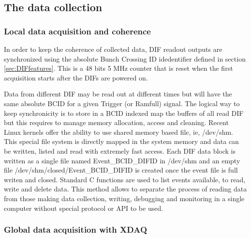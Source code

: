 \documentclass[english]{article}
\begin{document}
\subsection{The data collection}

\subsubsection{Local data acquisition and coherence}

 In order to  keep the coherence of collected data, DIF  readout outputs are synchronized using the absolute Bunch Crossing ID idedentifier defined in section \ref{sec:DIFfeatures}.
 This is a 48 bits  5 MHz counter that is reset when the first acquisition starts after the DIFs are powered on.  

Data from different DIF may be read out at  different times but will have the same absolute BCID for a given Trigger (or Ramfull) signal.
The logical way to keep synchronicity is to store in a BCID indexed
map the buffers of all read DIF but this requires to manage memory
allocation, access and cleaning. Recent Linux kernels offer the ability
to use shared memory based file, ie, /dev/shm. This special file system
is directly mapped in the system memory and data can be written, listed
and read with extremely fast access. Each DIF data block is written
as a single file named Event\_BCID\_DIFID in /dev/shm and an empty file
/dev/shm/closed/Event\_BCID\_DIFID is created once the event file
is full writen and closed. Standard C functions are used to list events available,
to read, write and delete data. This method allows to separate the
process of reading data from those making data collection, writing,
debugging and monitoring in a single computer without special protocol
or API to be used.


\subsubsection{Global data acquisition with XDAQ}
\end{document}
